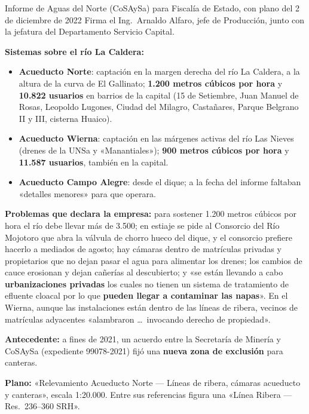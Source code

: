 \begin{ficha}{Informe de Aguas del Norte (CoSAySa) para Fiscalía de Estado, con plano del 2 de diciembre de 2022}
Firma el Ing.\ Arnaldo Alfaro, jefe de Producción, junto con la jefatura del Departamento Servicio Capital.

\textbf{Sistemas sobre el río La Caldera:}
\begin{itemize}[leftmargin=*,nosep]
\item \textbf{Acueducto Norte}: captación en la margen derecha del río La Caldera, a la altura de la curva de El Gallinato; \textbf{1.200 metros cúbicos por hora} y \textbf{10.822 usuarios} en barrios de la capital (15 de Setiembre, Juan Manuel de Rosas, Leopoldo Lugones, Ciudad del Milagro, Castañares, Parque Belgrano II y III, cisterna Huaico).
\item \textbf{Acueducto Wierna}: captación en las márgenes activas del río Las Nieves (drenes de la UNSa y «Manantiales»); \textbf{900 metros cúbicos por hora} y \textbf{11.587 usuarios}, también en la capital.
\item \textbf{Acueducto Campo Alegre}: desde el dique; a la fecha del informe faltaban «detalles menores» para que operara.
\end{itemize}

\textbf{Problemas que declara la empresa:} para sostener 1.200 metros cúbicos por hora el río debe llevar más de 3.500; en estiaje se pide al Consorcio del Río Mojotoro que abra la válvula de chorro hueco del dique, y el consorcio prefiere hacerlo a mediados de agosto; hay cámaras dentro de matrículas privadas y propietarios que no dejan pasar el agua para alimentar los drenes; los cambios de cauce erosionan y dejan cañerías al descubierto; y «se están llevando a cabo \textbf{urbanizaciones privadas} los cuales no tienen un sistema de tratamiento de efluente cloacal por lo que \textbf{pueden llegar a contaminar las napas}». En el Wierna, aunque las instalaciones están dentro de las líneas de ribera, vecinos de matrículas adyacentes «alambraron \ldots\ invocando derecho de propiedad».

\textbf{Antecedente:} a fines de 2021, un acuerdo entre la Secretaría de Minería y CoSAySa (expediente 99078-2021) fijó una \textbf{nueva zona de exclusión} para canteras.

\textbf{Plano:} «Relevamiento Acueducto Norte --- Líneas de ribera, cámaras acueducto y canteras», escala 1:20.000. Entre sus referencias figura una «Línea Ribera --- Res.\ 236--360 SRH».
\end{ficha}

